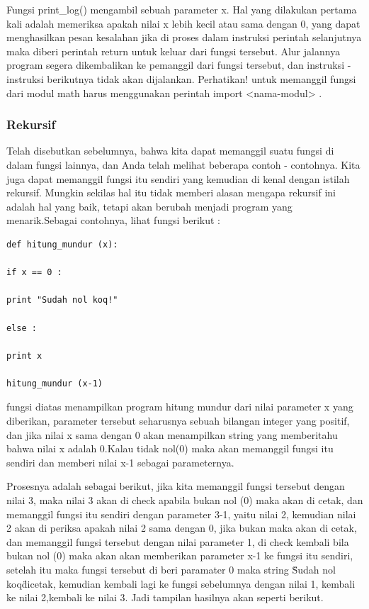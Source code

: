 Fungsi print_log() mengambil sebuah parameter x. Hal yang dilakukan pertama kali adalah memeriksa apakah nilai x lebih kecil atau sama dengan 0, yang dapat menghasilkan pesan kesalahan jika di proses dalam instruksi perintah selanjutnya maka diberi perintah return untuk keluar dari fungsi tersebut. Alur jalannya program segera dikembalikan ke pemanggil dari fungsi tersebut, dan instruksi - instruksi berikutnya tidak akan dijalankan. Perhatikan! untuk memanggil fungsi dari modul math harus menggunakan perintah import <nama-modul> .

 \subsubsection{Rekursif}

Telah disebutkan sebelumnya, bahwa kita dapat memanggil suatu fungsi di dalam fungsi lainnya, dan Anda telah melihat beberapa contoh - contohnya. Kita juga dapat memanggil fungsi itu sendiri yang kemudian di kenal dengan istilah rekursif. Mungkin sekilas hal itu tidak memberi alasan mengapa rekursif ini adalah hal yang baik, tetapi akan berubah menjadi program yang menarik.Sebagai contohnya, lihat 
fungsi berikut :

\begin{verbatim}
def hitung_mundur (x):

if x == 0 :

print "Sudah nol koq!"

else :

print x

hitung_mundur (x-1)
 \end{verbatim}
 
fungsi diatas menampilkan program hitung mundur dari nilai parameter x yang diberikan, parameter tersebut seharusnya sebuah bilangan integer yang positif, dan jika nilai x sama dengan 0 akan menampilkan string yang memberitahu bahwa nilai x adalah 0.Kalau tidak nol(0) maka akan memanggil fungsi itu sendiri dan memberi nilai x-1 sebagai parameternya.

Prosesnya adalah sebagai berikut, jika kita memanggil fungsi tersebut dengan nilai 3, maka nilai 3 akan di check apabila bukan nol (0) maka akan di cetak, dan memanggil fungsi itu sendiri dengan parameter 3-1, yaitu nilai 2, kemudian nilai 2 akan di periksa apakah nilai 2 sama dengan 0, jika bukan maka akan di cetak, dan memanggil fungsi tersebut dengan nilai parameter 1, di check kembali bila bukan
nol (0) maka akan akan memberikan parameter x-1 ke fungsi itu sendiri, setelah itu maka fungsi tersebut di beri paramater 0 maka string \"Sudah nol koq\" dicetak, kemudian kembali lagi ke fungsi sebelumnya dengan nilai 1, kembali ke nilai 2,kembali ke nilai 3.
Jadi tampilan hasilnya akan seperti berikut.

